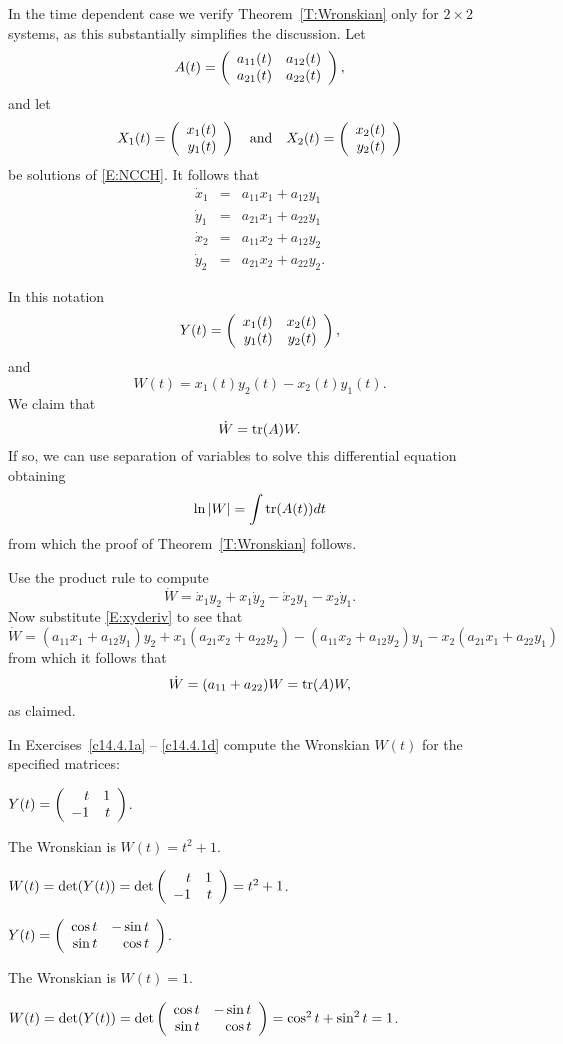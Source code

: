 \documentclass{ximera}
\begin{document}
In the time dependent case we verify Theorem~\ref{T:Wronskian} only 
for $2\times 2$ systems, as this 
substantially simplifies the discussion.   Let 
\[
A(t) = \left(\begin{array}{rr} a_{11}(t) & a_{12}(t)\\ a_{21}(t) &a_{22}(t)\end{array}\right),
\]
and let 
\[
X_1(t) = \left(\begin{array}{r} x_1(t) \\ y_1(t)\end{array}\right) \quad\mbox{and}\quad  X_2(t) = \left(\begin{array}{r} x_2(t) \\ y_2(t)\end{array}\right)
\]
be solutions of \eqref{E:NCCH}.  It follows that 
\begin{equation}   \label{E:xyderiv}
\begin{array}{rcl}
\dot{x}_1 & = & a_{11}x_1 + a_{12}y_1 \\
\dot{y}_1 & = & a_{21}x_1 + a_{22}y_1 \\
\dot{x}_2 & = & a_{11}x_2 + a_{12}y_2 \\
\dot{y}_2 & = & a_{21}x_2 + a_{22}y_2.
\end{array}
\end{equation}

In this notation 
\[
Y(t) = \left(\begin{array}{rr} x_1(t) & x_2(t)\\ y_1(t) &y_2(t)\end{array}\right),
\]
and
\[
W(t) = x_1(t)y_2(t) - x_2(t)y_1(t).
\]
We claim that 
\[
\dot{W} = {\rm tr}(A) W.
\]
If so, we can use separation of variables to solve this differential equation 
obtaining
\[
\ln |W| = \int {\rm tr}(A(t))dt 
\]
from which the proof of Theorem~\ref{T:Wronskian} follows.

Use the product rule to compute
\[
\dot{W}  =  \dot{x}_1y_2 + x_1\dot{y}_2 - \dot{x}_2y_1 - x_2\dot{y}_1.
\]
Now substitute \eqref{E:xyderiv} to see that 
\[
\dot{W} = (a_{11}x_1 + a_{12}y_1)y_2 + x_1(a_{21}x_2 + a_{22}y_2)
- (a_{11}x_2 + a_{12}y_2)y_1 - x_2(a_{21}x_1 + a_{22}y_1)
\]
from which it follows that 
\[
\dot{W} = (a_{11}+a_{22})W = {\rm tr}(A)W,
\]
as claimed.


\EXER

\TEXER

In Exercises~\ref{c14.4.1a} -- \ref{c14.4.1d} compute the Wronskian
$W(t)$ for the specified matrices:

\begin{exercise} \label{c14.4.1a}
$Y(t) = \left(\begin{array}{rr} t & 1\\ -1 &t\end{array}\right)$.

\begin{solution}
\ans The Wronskian is $W(t) = t^2 + 1$.

\soln $W(t) = \det(Y(t)) = \det\left(\begin{array}{rr} t & 1\\ -1 &t\end{array}\right) = t^2 + 1$.

\end{solution}
\end{exercise}

\begin{exercise} \label{c14.4.1b}
$Y(t) = \left(\begin{array}{rr} \cos t & -\sin t\\ \sin t &\cos t\end{array}\right)$.

\begin{solution}
\ans The Wronskian is $W(t) = 1$.

\soln $W(t) = \det(Y(t)) = \det\left(\begin{array}{rr} \cos t & -\sin t\\ \sin t &\cos t\end{array}\right) =
\cos^2 t + \sin^2 t = 1$.

\end{solution}
\end{exercise}
\end{document}
